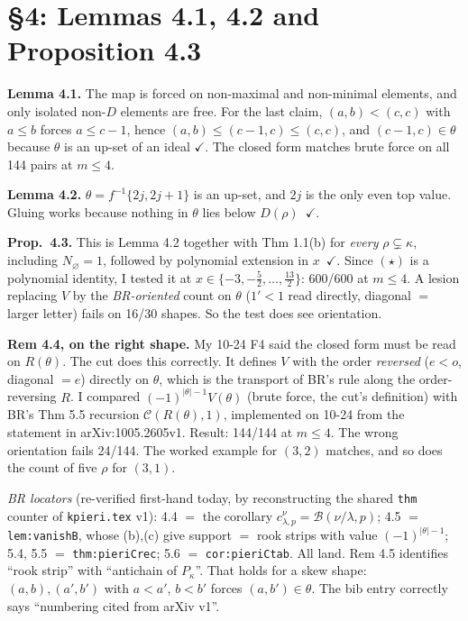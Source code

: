 \documentclass[11pt]{article}
\begin{document}
\section{\S4: Lemmas 4.1, 4.2 and Proposition 4.3}

\textbf{Lemma 4.1.} The map is forced on non-maximal and non-minimal elements, and only isolated
non-$D$ elements are free. For the last claim, $(a,b)<(c,c)$ with $a\le b$ forces $a\le c-1$,
hence $(a,b)\le(c-1,c)\le(c,c)$, and $(c-1,c)\in\theta$ because $\theta$ is an up-set of an ideal
$\checkmark$. The closed form matches brute force on all 144 pairs at $m\le4$.

\textbf{Lemma 4.2.} $\theta=f^{-1}\{2j,2j+1\}$ is an up-set, and $2j$ is the only even top value.
Gluing works because nothing in $\theta$ lies below $D(\rho)$~$\checkmark$.

\textbf{Prop.~4.3.} This is Lemma 4.2 together with Thm 1.1(b) for \emph{every}
$\rho\subsetneq\kappa$, including $N_\varnothing=1$, followed by polynomial extension in $x$~$\checkmark$.
Since $(\star)$ is a polynomial identity, I tested it at
$x\in\{-3,-\tfrac52,\dots,\tfrac{13}2\}$: 600/600 at $m\le4$. A lesion replacing $V$ by the \emph{BR-oriented} count on $\theta$ ($1'<1$ read
directly, diagonal $=$ larger letter) fails on 16/30 shapes. So the test does see orientation.

\textbf{Rem 4.4, on the right shape.} My 10-24 F4 said the closed form must be read on $R(\theta)$.
The cut does this correctly. It defines $V$ with the order \emph{reversed} ($e<o$, diagonal $=e$)
directly on $\theta$, which is the transport of BR's rule along the order-reversing $R$. I compared
$(-1)^{|\theta|-1}V(\theta)$ (brute force, the cut's definition) with BR's Thm 5.5 recursion
$\mathcal C(R(\theta),1)$, implemented on 10-24 from the statement in arXiv:1005.2605v1. Result:
144/144 at $m\le4$. The wrong orientation fails 24/144. The worked example for $(3,2)$ matches, and
so does the count of five $\rho$ for $(3,1)$.

\emph{BR locators} (re-verified first-hand today, by reconstructing the shared \texttt{thm} counter
of \texttt{kpieri.tex} v1):
4.4 $=$ the corollary $c^\nu_{\lambda,p}=\mathcal B(\nu/\lambda,p)$; 4.5 $=$
\texttt{lem:vanishB}, whose (b),(c) give support $=$ rook strips with value $(-1)^{|\theta|-1}$;
5.4, 5.5 $=$ \texttt{thm:pieriCrec}; 5.6 $=$ \texttt{cor:pieriCtab}. All land. Rem 4.5 identifies
``rook strip'' with ``antichain of $P_\kappa$''. That holds for a skew shape: $(a,b),(a',b')$ with
$a<a'$, $b<b'$ forces $(a,b')\in\theta$. The bib entry correctly says ``numbering cited from arXiv
v1''.
\end{document}
